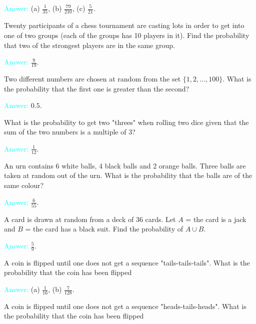 \documentclass[14pt]{exam}
\begin{document}
\begin{questions}
		\textcolor{cyan}{Answer:} (a) $\frac{1}{35}$, (b) $\frac{79}{210}$, (c) $\frac{5}{21}$.
		
		\question
		Twenty participants of a chess tournament are casting lots in order to get into one of two groups (each of the groups has 10 players in it). Find the probability that two of the strongest players are in the same group.
		
		\textcolor{cyan}{Answer:} $\frac{9}{19}$.
		
		\question
		Two different numbers are chosen at random from the set $\{1, 2, \dots, 100\}$. What is the probability that the first one is greater than the second?
		
		\textcolor{cyan}{Answer:} $0.5$.
		
		\question
		What is the probability to get two "threes" when rolling two dice given that the sum of the two numbers is a multiple of 3?
		
		\textcolor{cyan}{Answer:} $\frac{1}{12}$.
		
		\question
		An urn contains 6 white balls, 4 black balls and 2 orange balls. Three balls are taken at random out of the urn. What is the probability that the balls are of the same colour?
		
		\textcolor{cyan}{Answer:} $\frac{6}{55}$.
		
		\question
		A card is drawn at random from a deck of 36 cards. Let $A$ = {the card is a jack} and $B$ = {the card has a black suit}. Find the probability of $A \cup B$.
		
		\textcolor{cyan}{Answer:} $\frac{5}{9}$.
		
		\question
		A coin is flipped until one does not get a sequence "tails-tails-tails". What is the probability that the coin has been flipped
		
		
		\textcolor{cyan}{Answer:} (a) $\frac{1}{16}$, (b) $\frac{7}{128}$.
		
		\question
		A coin is flipped until one does not get a sequence "heads-tails-heads". What is the probability that the coin has been flipped
		

\end{questions}
\end{document}
